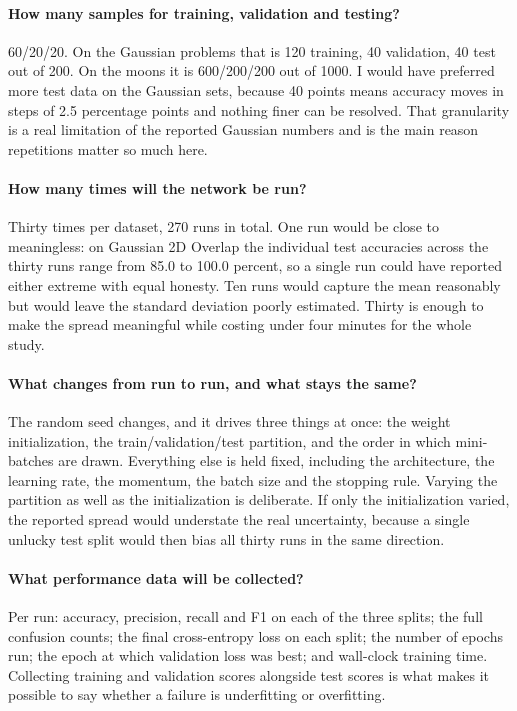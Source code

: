 \documentclass[11pt]{article}
\begin{document}
\paragraph{How many samples for training, validation and testing?}
60/20/20. On the Gaussian problems that is 120 training, 40 validation, 40 test
out of 200. On the moons it is 600/200/200 out of 1000. I would have preferred
more test data on the Gaussian sets, because 40 points means accuracy moves in
steps of 2.5 percentage points and nothing finer can be resolved. That
granularity is a real limitation of the reported Gaussian numbers and is the
main reason repetitions matter so much here.

\paragraph{How many times will the network be run?}
Thirty times per dataset, 270 runs in total. One run would be close to
meaningless: on Gaussian 2D Overlap the individual test accuracies across the
thirty runs range from 85.0 to 100.0 percent, so a single run could have
reported either extreme with equal honesty. Ten runs would capture the mean
reasonably but would leave the standard deviation poorly estimated. Thirty is
enough to make the spread meaningful while costing under four minutes for the
whole study.

\paragraph{What changes from run to run, and what stays the same?}
The random seed changes, and it drives three things at once: the weight
initialization, the train/validation/test partition, and the order in which
mini-batches are drawn. Everything else is held fixed, including the
architecture, the learning rate, the momentum, the batch size and the stopping
rule. Varying the partition as well as the initialization is deliberate. If only
the initialization varied, the reported spread would understate the real
uncertainty, because a single unlucky test split would then bias all thirty
runs in the same direction.

\paragraph{What performance data will be collected?}
Per run: accuracy, precision, recall and F1 on each of the three splits; the
full confusion counts; the final cross-entropy loss on each split; the number of
epochs run; the epoch at which validation loss was best; and wall-clock training
time. Collecting training and validation scores alongside test scores is what
makes it possible to say whether a failure is underfitting or overfitting.
\end{document}
